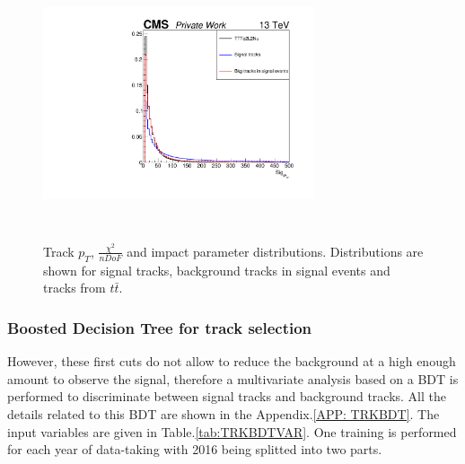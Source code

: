 \documentclass{cernatlasnote}
\begin{document}
\begin{figure}[ht]
        \includegraphics[height=8cm, width=8cm, trim= 0cm 0cm 0cm 0cm,clip]{images/TRK/drSig_TT.pdf}
        \caption{\label{fig:TRKDis} Track $p_T$, $\frac{\chi^2}{nDoF}$ and impact parameter distributions. Distributions are shown for signal tracks, background tracks in signal events and tracks from $t\bar{t}$. }
        \end{figure}

        \FloatBarrier

\subsubsection{Boosted Decision Tree for track selection}
However, these first cuts do not allow to reduce the background at a high enough amount to observe the signal, therefore a multivariate analysis based on a BDT is performed to discriminate between signal tracks and background tracks. All the details related to this BDT are shown in the Appendix.\ref{APP: TRKBDT}. The input variables are given in Table.\ref{tab:TRKBDTVAR}. One training is performed for each year of data-taking with 2016 being splitted into two parts. 
\end{document}
